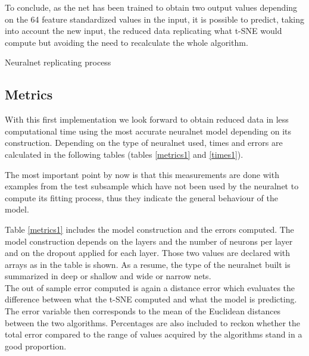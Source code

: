 \documentclass[a4paper,11pt,spanish]{report}
\makeatletter
\def\BState{\State\hskip-\ALG@thistlm}
\makeatother
\begin{document}
To conclude, as the net has been trained to obtain two output values depending on the 64 feature standardized values in the input, it is possible to predict, taking into account the new input, the reduced data replicating what t-SNE would compute but avoiding the need to recalculate the whole algorithm.\\

\begin{algorithm}
\caption{Neuralnet replicating process}
\end{algorithm}

\subsection{Metrics}
\label{ssec:met1}

With this first implementation we look forward to obtain reduced data in less computational time using the most accurate neuralnet model depending on its construction. Depending on the type of neuralnet used, times and errors are calculated in the following tables (tables \ref{metrics1} and \ref{times1}).

The most important point by now is that this measurements are done with examples from the test subsample which have not been used by the neuralnet to compute its fitting process, thus they indicate the general behaviour of the model.

Table \ref{metrics1} includes the model construction and the errors computed. The model construction depends on the layers and the number of neurons per layer and on the dropout applied for each layer. Those two values are declared with arrays as in the table is shown. As a resume, the type of the neuralnet built is summarized in deep or shallow and wide or narrow nets.\\
The out of sample error computed is again a distance error which evaluates the difference between what the t-SNE computed and what the model is predicting. The error variable then corresponds to the mean of the Euclidean distances between the two algorithms. Percentages are also included to reckon whether the total error compared to the range of values acquired by the algorithms stand in a good proportion.
\end{document}
